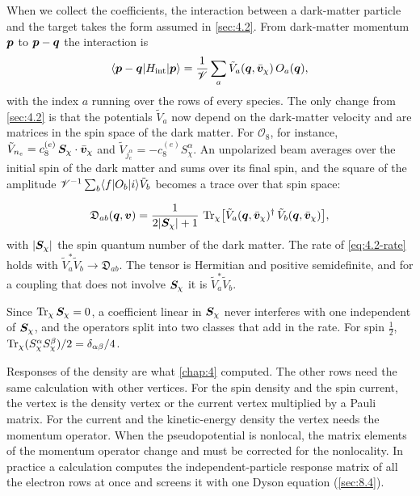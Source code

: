 When we collect the coefficients, the interaction between a dark-matter particle and the target takes the form assumed in \cref{sec:4.2}. From dark-matter momentum $\bm{p}$ to $\bm{p} - \bm{q}$ the interaction is
\begin{equation}
  \langle\bm{p} - \bm{q}|H_{\mathrm{int}}|\bm{p}\rangle = \frac1{\mathscr{V}}\sum_a\tilde V_a(\bm{q}, \bar{\bm{v}}_\chi)\,O_a(\bm{q}) ,
  \label{eq:8.1-Hint}
\end{equation}
with the index $a$ running over the rows of every species. The only change from \cref{sec:4.2} is that the potentials $\tilde V_a$ now depend on the dark-matter velocity and are matrices in the spin space of the dark matter. For $\mathcal{O}_8$, for instance, $\tilde V_{n_e} = c_8^{(e)}\,\bm{S}_\chi\cdot\bar{\bm{v}}_\chi$ and $\tilde V_{j^\alpha_e} = -c_8^{(e)}S^\alpha_\chi$. An unpolarized beam averages over the initial spin of the dark matter and sums over its final spin, and the square of the amplitude $\mathscr{V}^{-1}\sum_b\langle f|O_b|i\rangle\tilde V_b$ becomes a trace over that spin space:
\begin{keyresult}
\begin{equation}
  \mathfrak{D}_{ab}(\bm{q}, \bm{v}) = \frac{1}{2|\bm{S}_\chi| + 1}\,\operatorname{Tr}_\chi\bigl[\tilde V_a(\bm{q}, \bar{\bm{v}}_\chi)^\dagger\,\tilde V_b(\bm{q}, \bar{\bm{v}}_\chi)\bigr] ,
  \label{eq:8.1-D}
\end{equation}
with $|\bm{S}_\chi|$ the spin quantum number of the dark matter. The rate of \cref{eq:4.2-rate} holds with $\tilde V_a^*\tilde V_b \to \mathfrak{D}_{ab}$. The tensor is Hermitian and positive semidefinite, and for a coupling that does not involve $\bm{S}_\chi$ it is $\tilde V_a^*\tilde V_b$.
\end{keyresult}
\noindent Since $\operatorname{Tr}_\chi\bm{S}_\chi = 0$, a coefficient linear in $\bm{S}_\chi$ never interferes with one independent of $\bm{S}_\chi$, and the operators split into two classes that add in the rate. For spin $\frac12$, $\operatorname{Tr}_\chi(S^\alpha_\chi S^\beta_\chi)/2 = \delta_{\alpha\beta}/4$.

Responses of the density are what \cref{chap:4} computed. The other rows need the same calculation with other vertices. For the spin density and the spin current, the vertex is the density vertex or the current vertex multiplied by a Pauli matrix. For the current and the kinetic-energy density the vertex needs the momentum operator. When the pseudopotential is nonlocal, the matrix elements of the momentum operator change and must be corrected for the nonlocality. In practice a calculation computes the independent-particle response matrix of all the electron rows at once and screens it with one Dyson equation (\cref{sec:8.4}).

